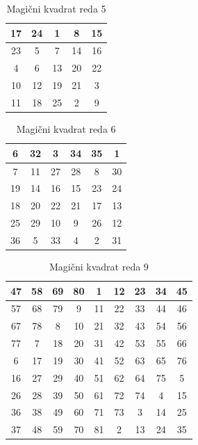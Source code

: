 \documentclass[a4paper,12pt]{article}
\newenvironment{magic}[3]
   {\begin{table}[h]
      \caption{#2}
      \label{#3}
      \large
      \centering
      \begin{tabular}{|*{#1}{c|}}
         \hline
   }
      {
      \end{tabular}
      \end{table}
      }
\begin{document}
\begin{magic}{5}{Magični kvadrat reda 5}{table:mag5}
   17 & 24 &  1 &  8 & 15 \\\hline
   23 &  5 &  7 & 14 & 16 \\\hline
   4 &  6 & 13 & 20 & 22 \\\hline
   10 & 12 & 19 & 21 &  3 \\\hline
   11 & 18 & 25 &  2 &  9 \\\hline
\end{magic}
\begin{magic}{6}{Magični kvadrat reda 6}{table:mag6}
   6 & 32 &  3 & 34 & 35 &  1 \\\hline
   7 & 11 & 27 & 28 &  8 & 30 \\\hline
   19 & 14 & 16 & 15 & 23 & 24 \\\hline
   18 & 20 & 22 & 21 & 17 & 13 \\\hline
   25 & 29 & 10 &  9 & 26 & 12 \\\hline
   36 &  5 & 33 &  4 &  2 & 31 \\\hline
\end{magic}
\begin{magic}{9}{Magični kvadrat reda 9}{table:mag9}
   47 & 58 & 69 & 80 &  1 & 12 & 23 & 34 & 45 \\\hline
   57 & 68 & 79 &  9 & 11 & 22 & 33 & 44 & 46 \\\hline
   67 & 78 &  8 & 10 & 21 & 32 & 43 & 54 & 56 \\\hline
   77 &  7 & 18 & 20 & 31 & 42 & 53 & 55 & 66 \\\hline
    6 & 17 & 19 & 30 & 41 & 52 & 63 & 65 & 76 \\\hline
   16 & 27 & 29 & 40 & 51 & 62 & 64 & 75 &  5 \\\hline
   26 & 28 & 39 & 50 & 61 & 72 & 74 &  4 & 15 \\\hline
   36 & 38 & 49 & 60 & 71 & 73 &  3 & 14 & 25 \\\hline
   37 & 48 & 59 & 70 & 81 &  2 & 13 & 24 & 35 \\\hline
\end{magic}
\end{document}
